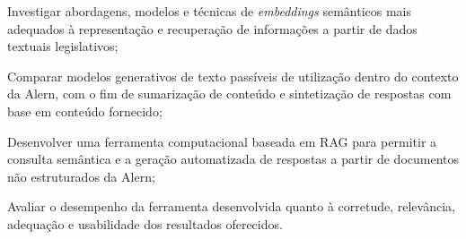 Investigar abordagens, modelos e técnicas de \textit{embeddings} semânticos mais adequados à representação e recuperação de informações a partir de dados textuais legislativos;

Comparar modelos generativos de texto passíveis de utilização dentro do contexto da \ac{Alern}, com o fim de sumarização de conteúdo e sintetização de respostas com base em conteúdo fornecido;

Desenvolver uma ferramenta computacional baseada em \ac{RAG} para permitir a consulta semântica e a geração automatizada de respostas a partir de documentos não estruturados da \ac{Alern};

Avaliar o desempenho da ferramenta desenvolvida quanto à corretude, relevância, adequação e usabilidade dos resultados oferecidos.